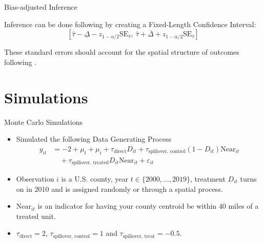 \documentclass[aspectratio=43]{beamer}
\begin{document}
\begin{frame}{Bias-adjusted Inference}

    Inference can be done following \citet{Rambachan_Roth_2020} by creating a Fixed-Length Confidence Interval: 
    \[ 
        \left[
            \hat{\tau} - \underline{\Delta} - z_{1 - \alpha/2} \text{SE}_{\hat{\tau}}, \ \hat{\tau} + \overline{\Delta} + z_{1 - \alpha/2} \text{SE}_{\hat{\tau}}
        \right]
    \]

    These standard errors should account for the spatial structure of outcomes following \citet{Conley_1999}.
\end{frame}




\section{Simulations}

\begin{frame}{Monte Carlo Simulations}
    \begin{itemize}
        \item Simulated the following Data Generating Process \begin{align*}
            y_{it} &= -2 + \mu_t + \mu_i + \tau_{\text{direct}} D_{it} + \tau_{\text{spillover, control}} (1-D_{it}) \text{Near}_{it} \\ 
            &\quad + \tau_{\text{spillover, treated}} D_{it} \text{Near}_{it} + \varepsilon_{it}
        \end{align*}

        \item Observation $i$ is a U.S. county, year $t \in \{2000, \dots, 2019\}$, treatment $D_{it}$ turns on in 2010 and is assigned randomly or through a spatial process.
        
        \item $\text{Near}_{it}$ is an indicator for having your county centroid be within 40 miles of a treated unit. 
        
        \item $\tau_{\text{direct}} = 2$, $\tau_{\text{spillover, control}} = 1$ and $\tau_{\text{spillover, treat}} = -0.5$.
    \end{itemize}
\end{frame}
\end{document}
